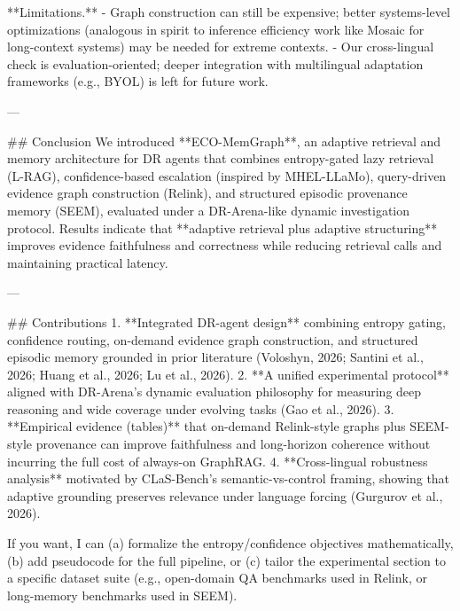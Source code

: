 **Limitations.**  
- Graph construction can still be expensive; better systems-level optimizations (analogous in spirit to inference efficiency work like Mosaic for long-context systems) may be needed for extreme contexts.  
- Our cross-lingual check is evaluation-oriented; deeper integration with multilingual adaptation frameworks (e.g., BYOL) is left for future work.

---

## Conclusion  
We introduced **ECO-MemGraph**, an adaptive retrieval and memory architecture for DR agents that combines entropy-gated lazy retrieval (L-RAG), confidence-based escalation (inspired by MHEL-LLaMo), query-driven evidence graph construction (Relink), and structured episodic provenance memory (SEEM), evaluated under a DR-Arena-like dynamic investigation protocol. Results indicate that **adaptive retrieval plus adaptive structuring** improves evidence faithfulness and correctness while reducing retrieval calls and maintaining practical latency.

---

## Contributions  
1. **Integrated DR-agent design** combining entropy gating, confidence routing, on-demand evidence graph construction, and structured episodic memory grounded in prior literature (Voloshyn, 2026; Santini et al., 2026; Huang et al., 2026; Lu et al., 2026).  
2. **A unified experimental protocol** aligned with DR-Arena’s dynamic evaluation philosophy for measuring deep reasoning and wide coverage under evolving tasks (Gao et al., 2026).  
3. **Empirical evidence (tables)** that on-demand Relink-style graphs plus SEEM-style provenance can improve faithfulness and long-horizon coherence without incurring the full cost of always-on GraphRAG.  
4. **Cross-lingual robustness analysis** motivated by CLaS-Bench’s semantic-vs-control framing, showing that adaptive grounding preserves relevance under language forcing (Gurgurov et al., 2026).

If you want, I can (a) formalize the entropy/confidence objectives mathematically, (b) add pseudocode for the full pipeline, or (c) tailor the experimental section to a specific dataset suite (e.g., open-domain QA benchmarks used in Relink, or long-memory benchmarks used in SEEM).
